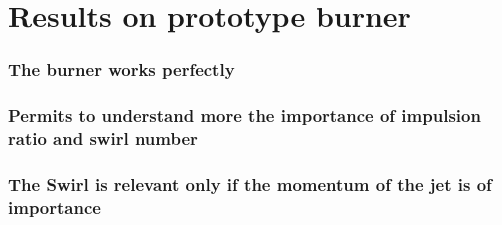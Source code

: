 \section{Results on prototype burner}
\subsubsection{The burner works perfectly}
\subsubsection{Permits to understand more the importance of impulsion ratio and swirl number}
\subsubsection{The Swirl is relevant only if the momentum of the jet is of importance}